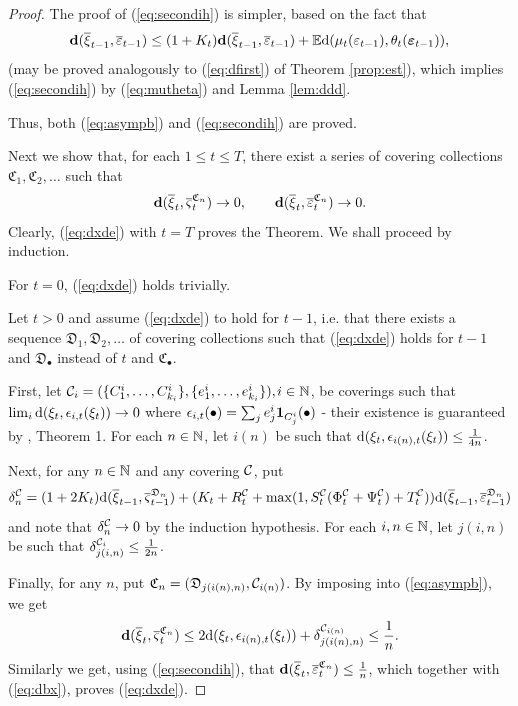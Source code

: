 \documentclass{article}              %
\begin{document}
\begin{proof}
The proof of (\ref{eq:secondih}) is simpler, based on the fact that
\[
\mathbf{d}(\overline{\xi}_{t-1},\overline{\varepsilon}_{t-1})\leq(1+K_{t})\mathbf{d}(\overline{\xi}_{t-1},\overline{\varepsilon}_{t-1})+\mathbb{E}\mathrm{d}(\mu_{t}(\varepsilon_{t-1}),\theta_{t}(\boldsymbol{\varepsilon}_{t-1})),
\]
(may be proved analogously to (\ref{eq:dfirst}) of Theorem \ref{prop:est}),
which implies (\ref{eq:secondih}) by (\ref{eq:mutheta}) and Lemma
\ref{lem:ddd}.

Thus, both (\ref{eq:asympb}) and (\ref{eq:secondih}) are proved.

Next we show that, for each $1\leq t\leq T$, there exist a series
of covering collections $\mathfrak{C}_{1},\mathfrak{C}_{2},\dots$
such that 
\begin{equation}
\mathbf{d}(\overline{\xi}_{t},\overline{\varsigma}_{t}^{\mathfrak{C}_{n}})\rightarrow0,\qquad \mathbf{d}(\overline{\xi}_{t},\overline{\varepsilon}_{t}^{\mathfrak{C}_{n}})\rightarrow0.\label{eq:dxde}
\end{equation}
 Clearly, (\ref{eq:dxde}) with $t=T$ proves the Theorem. We shall proceed by induction. 
 
 For $t=0$, (\ref{eq:dxde}) holds trivially. 

Let $t>0$ and assume (\ref{eq:dxde}) to hold for $t-1$, i.e. that there
exists a sequence $\mathfrak{D}_{1},\mathfrak{D}_{2},\dots$ of covering
collections such that (\ref{eq:dxde}) holds for $t-1$ and $\mathfrak{D_{\bullet}}$ instead of
$t$ and $\mathfrak{C_{\bullet}}$. 


First, let $\mathcal{C}_{i}=(\{C_{1}^{i},\dots,C_{k_{i}}^{i}\},\{e_{1}^{i},\dots,e_{k_{i}}^{i}\}),$$i\in\mathbb{N}$,
be coverings such that $\lim_{i}\mathrm{d}(\xi_{t},\epsilon_{i,t}(\xi_{t}))\rightarrow0$
where $\epsilon_{i,t}(\bullet)=\sum_{j}e_{j}^{i}\mathbf{1}_{C_{j}^{i}}(\bullet)$
- their existence is guaranteed by \cite{Smid09c}, Theorem 1. For
each $n\in\mathbb{N}$, let $i(n)$ be such that $\mathrm{d}(\xi_{t},\epsilon_{i(n),t}(\xi_{t}))\leq\frac{1}{4n}$.

Next, for any $n\in \mathbb{N}$ and any covering $\mathcal{C}$, put 
\begin{equation}
\delta_{n}^{\mathcal{C}}=(1+2K_{t})\mathrm{d}(\overline{\xi}_{t-1},\overline{\varsigma}_{t-1}^{\mathfrak{D}_{n}})
+(K_{t}+R_{t}^{\mathcal{C}}+\max(1,S_{t}^{\mathcal{C}}(\Phi_{t}^{\mathcal{C}}+\Psi_{t}^{\mathcal{C}})+T_{t}^{\mathcal{C}}))\mathrm{d}(\overline{\xi}_{t-1},\overline{\varepsilon}_{t-1}^{\mathfrak{D}_{n}})\label{eq:deltac}
\end{equation}
and note that $\delta_{n}^{\mathcal{C}}\rightarrow0$ by the induction hypothesis. 
For each $i,n\in\mathbb{N}$, let $j(i,n)$ be such that $\delta_{j(i,n)}^{\mathcal{C}_{i}}\leq\frac{1}{2n}$.

Finally, for any $n$, put $\mathfrak{C}_{n}=(\mathfrak{D}_{j(i(n),n)},\mathcal{C}_{i(n)})$.
By imposing into (\ref{eq:asympb}), we get 
\begin{equation}
\mathbf{d}(\overline{\xi}_{t},\overline{\varsigma}_{t}^{\mathfrak{C}_{n}})\leq2\mathrm{d}(\xi_{t},\epsilon_{i(n),t}(\xi_{t}))+\delta_{j(i(n),n)}^{\mathcal{C}_{i(n)}}\leq\frac{1}{n}.
\label{eq:dbx}
\end{equation}
Similarly we get, using (\ref{eq:secondih}), that $\mathbf{d}(\overline{\xi}_{t},\overline{\varepsilon}_{t}^{\mathfrak{C}_{n}})\leq\frac{1}{n}$,
which together with (\ref{eq:dbx}), proves (\ref{eq:dxde}).
\end{proof}
\end{document}
